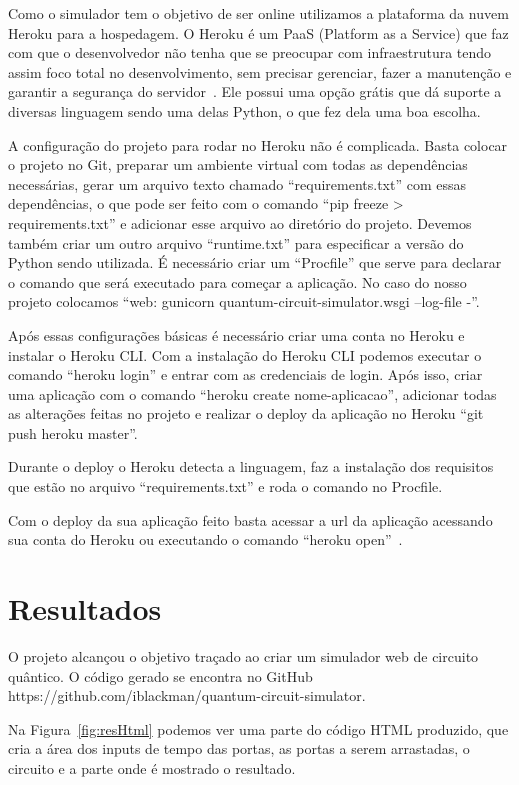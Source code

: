 \documentclass[a4paper, 12pt, oneside]{book}
\begin{document}
Como o simulador tem o objetivo de ser online utilizamos a plataforma da nuvem Heroku para a hospedagem. O Heroku é um PaaS (Platform as a Service) que faz com que o desenvolvedor não tenha que se preocupar com infraestrutura tendo assim foco total no desenvolvimento, sem precisar gerenciar, fazer a manutenção e garantir a segurança do servidor~\cite{heroku}. Ele possui uma opção grátis que dá suporte a diversas linguagem sendo uma delas Python, o que fez dela uma boa escolha.

A configuração do projeto para rodar no Heroku não é complicada. Basta colocar o projeto no Git, preparar um ambiente virtual com todas as dependências necessárias, gerar um arquivo texto chamado ``requirements.txt'' com essas dependências, o que pode ser feito com o comando ``pip freeze > requirements.txt'' e adicionar esse arquivo ao diretório do projeto. Devemos também criar um outro arquivo ``runtime.txt'' para especificar a versão do Python sendo utilizada. É necessário criar um ``Procfile'' que serve para declarar o comando que será executado para começar a aplicação. No caso do nosso projeto colocamos ``web: gunicorn quantum-circuit-simulator.wsgi --log-file -''.

Após essas configurações básicas é necessário criar uma conta no Heroku e instalar o Heroku CLI. Com a instalação do Heroku CLI podemos executar o comando ``heroku login'' e entrar com as credenciais de login. Após isso, criar uma aplicação com o comando ``heroku create nome-aplicacao'', adicionar todas as alterações feitas no projeto e realizar o deploy da aplicação no Heroku ``git push heroku master''.

Durante o deploy o Heroku detecta a linguagem, faz a instalação dos requisitos que estão no arquivo ``requirements.txt'' e roda o comando no Procfile.

Com o deploy da sua aplicação feito basta acessar a url da aplicação acessando sua conta do Heroku ou executando o comando ``heroku open''~\cite{heroku-python}.

\section{Resultados}

O projeto alcançou o objetivo traçado ao criar um simulador web de circuito quântico. O código gerado se encontra no GitHub https://github.com/iblackman/quantum-circuit-simulator.

Na Figura~\ref{fig:resHtml} podemos ver uma parte do código HTML produzido, que cria a área dos inputs de tempo das portas, as portas a serem arrastadas, o circuito e a parte onde é mostrado o resultado.
\end{document}
